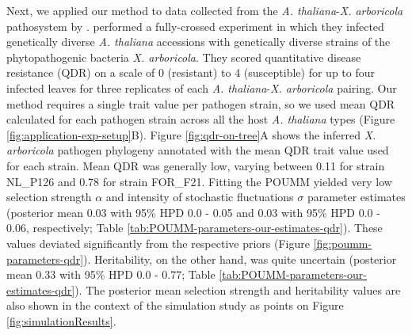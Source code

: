 \documentclass[11pt]{article}
\begin{document}
\begin{linenumbers}
Next, we applied our method to data collected from the \emph{A. thaliana}-\emph{X. arboricola} pathosystem by \cite{Wang2018Two-wayGenomes}. \cite{Wang2018Two-wayGenomes} performed a fully-crossed experiment in which they infected genetically diverse \emph{A. thaliana} accessions with genetically diverse strains of the phytopathogenic bacteria \emph{X. arboricola}. They scored quantitative disease resistance (QDR) on a scale of 0 (resistant) to 4 (susceptible) for up to four infected leaves for three replicates of each \emph{A. thaliana}-\emph{X. arboricola} pairing. Our method requires a single trait value per pathogen strain, so we used mean QDR calculated for each pathogen strain across all the host \emph{A. thaliana} types (Figure \ref{fig:application-exp-setup}B). Figure \ref{fig:qdr-on-tree}A shows the inferred \emph{X. arboricola} pathogen phylogeny annotated with the  mean QDR trait value used for each strain. Mean QDR  was generally low, varying between 0.11 for strain NL\_P126 and 0.78 for strain FOR\_F21. Fitting the POUMM yielded very low selection strength $\alpha$ and intensity of stochastic fluctuations  $\sigma$ parameter estimates (posterior mean 0.03 with 95\% HPD 0.0 - 0.05 and 0.03 with 95\% HPD 0.0 - 0.06, respectively; Table \ref{tab:POUMM-parameters-our-estimates-qdr}). These values deviated significantly from the respective priors (Figure \ref{fig:poumm-parameters-qdr}). Heritability, on the other hand, was quite uncertain (posterior mean 0.33 with 95\% HPD 0.0 - 0.77; Table \ref{tab:POUMM-parameters-our-estimates-qdr}). The posterior mean selection strength and heritability values are also shown in the context of the simulation study as points on Figure \ref{fig:simulationResults}.


\end{linenumbers}
\end{document}
